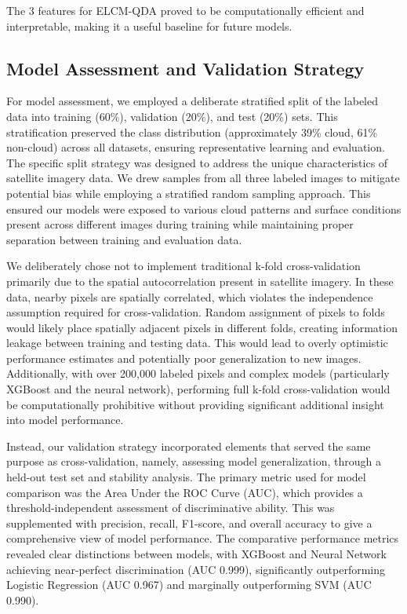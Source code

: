 \documentclass[10pt,letterpaper]{article}
\begin{document}
The 3 features for ELCM-QDA proved to be computationally efficient and interpretable, making it a useful baseline for future models. 





\subsection{Model Assessment and Validation Strategy}

For model assessment, we employed a deliberate stratified split of the labeled data into training (60\%), validation (20\%), and test (20\%) sets. This stratification preserved the class distribution (approximately 39\% cloud, 61\% non-cloud) across all datasets, ensuring representative learning and evaluation. The specific split strategy was designed to address the unique characteristics of satellite imagery data. We drew samples from all three labeled images to mitigate potential bias while employing a stratified random sampling approach. This ensured our models were exposed to various cloud patterns and surface conditions present across different images during training while maintaining proper separation between training and evaluation data.

We deliberately chose not to implement traditional k-fold cross-validation primarily due to the spatial autocorrelation present in satellite imagery. In these data, nearby pixels are spatially correlated, which violates the independence assumption required for cross-validation. Random assignment of pixels to folds would likely place spatially adjacent pixels in different folds, creating information leakage between training and testing data. This would lead to overly optimistic performance estimates and potentially poor generalization to new images. Additionally, with over 200,000 labeled pixels and complex models (particularly XGBoost and the neural network), performing full k-fold cross-validation would be computationally prohibitive without providing significant additional insight into model performance.

Instead, our validation strategy incorporated elements that served the same purpose as cross-validation, namely, assessing model generalization, through a held-out test set and stability analysis. The primary metric used for model comparison was the Area Under the ROC Curve (AUC), which provides a threshold-independent assessment of discriminative ability. This was supplemented with precision, recall, F1-score, and overall accuracy to give a comprehensive view of model performance. The comparative performance metrics revealed clear distinctions between models, with XGBoost and Neural Network achieving near-perfect discrimination (AUC 0.999), significantly outperforming Logistic Regression (AUC 0.967) and marginally outperforming SVM (AUC 0.990).
\end{document}
